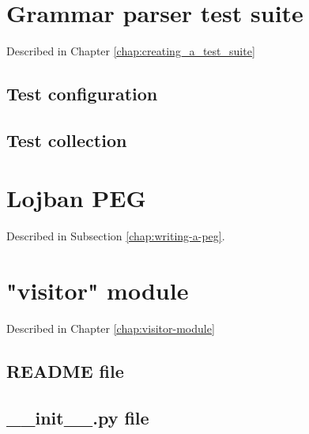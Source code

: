 

\chapter{Grammar parser test suite}
\label{appendix:parser-testing-annex}

Described in Chapter \ref{chap:creating_a_test_suite}

\section{Test configuration}



\newpage

\section{Test collection}



\chapter{Lojban PEG}
\label{appendix:peg-annex}

Described in Subsection \ref{chap:writing-a-peg}.



\chapter{"visitor" module}
\label{appendix:gentufa-visitor-annex}

Described in Chapter \ref{chap:visitor-module}

\section{README file}



\section{\_\_init\_\_.py file}



